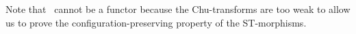     Note that \chuintost\ cannot be a functor because the Chu-transforms are too weak
    to allow us to prove the configuration-preserving property of the ST-morphisms.








